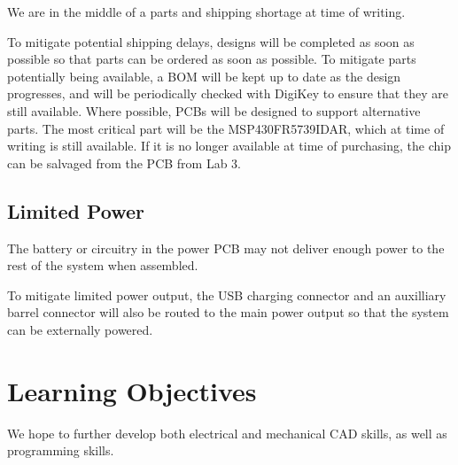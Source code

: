 \documentclass{notes}
\begin{document}
We are in the middle of a parts and shipping shortage at time of writing.

To mitigate potential shipping delays, designs will be completed as soon as possible so that parts can be ordered as soon as possible.
To mitigate parts potentially being available, a BOM will be kept up to date as the design progresses, and will be periodically checked with DigiKey to ensure that they are still available.
Where possible, PCBs will be designed to support alternative parts.
The most critical part will be the MSP430FR5739IDAR, which at time of writing is still available.
If it is no longer available at time of purchasing, the chip can be salvaged from the PCB from Lab 3.

\subsection{Limited Power}

The battery or circuitry in the power PCB may not deliver enough power to the rest of the system when assembled.

To mitigate limited power output, the USB charging connector and an auxilliary barrel connector will also be routed to the main power output so that the system can be externally powered.

\section{Learning Objectives}

We hope to further develop both electrical and mechanical CAD skills, as well as programming skills.
\end{document}
